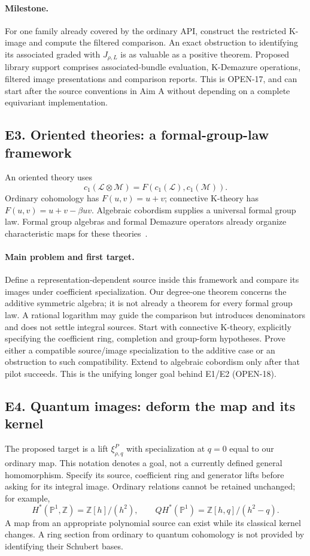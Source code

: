 \documentclass[11pt,letterpaper]{article}
\newcommand{\Z}{\mathbb Z}
\begin{document}
\paragraph{Milestone.}
For one family already covered by the ordinary API, construct the
restricted K-image and compute the filtered comparison.
An exact obstruction to identifying its associated graded with
\(J_{\rho,L}\) is as valuable as a positive theorem.
Proposed library support comprises associated-bundle evaluation,
K-Demazure operations, filtered image presentations and comparison reports.
This is OPEN-17, and can start after the source conventions in Aim A
without depending on a complete equivariant implementation.

\subsection*{E3. Oriented theories: a formal-group-law framework}
An oriented theory uses
\[
 c_1(\mathcal L\otimes\mathcal M)
   =F(c_1(\mathcal L),c_1(\mathcal M)).
\]
Ordinary cohomology has \(F(u,v)=u+v\);
connective K-theory has \(F(u,v)=u+v-\beta uv\).
Algebraic cobordism supplies a universal formal group law.
Formal group algebras and formal Demazure operators already organize
characteristic maps for these theories~\cite{CPZ,CZZ}.

\paragraph{Main problem and first target.}
Define a representation-dependent source inside this framework and compare
its images under coefficient specialization. Our degree-one theorem
concerns the additive symmetric algebra; it is not already a theorem
for every formal group law. A rational logarithm may guide the comparison
but introduces denominators and does not settle integral sources.
Start with connective K-theory, explicitly specifying the coefficient
ring, completion and group-form hypotheses. Prove either a compatible
source/image specialization to the additive case or an obstruction to
such compatibility. Extend to algebraic cobordism only after that pilot
succeeds. This is the unifying longer goal behind E1/E2 (OPEN-18).

\newpage
\subsection*{E4. Quantum images: deform the map and its kernel}
The proposed target is a lift \(\xi_{\rho,q}^P\) with specialization
at \(q=0\) equal to our ordinary map. This notation denotes a goal,
not a currently defined general homomorphism. Specify its source,
coefficient ring and generator lifts before asking for its integral image.
Ordinary relations cannot be retained unchanged; for example,
\[
 H^*(\mathbb P^1,\Z)=\Z[h]/(h^2),\qquad
 QH^*(\mathbb P^1)=\Z[h,q]/(h^2-q).
\]
A map from an appropriate polynomial source can exist while its classical
kernel changes. A ring section from ordinary to quantum cohomology is
not provided by identifying their Schubert bases.
\end{document}
